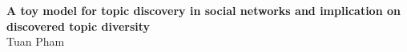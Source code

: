 \begin{flushleft}
{\Large
\textbf{A toy model for topic discovery in social networks and implication on discovered topic diversity}
}
\newline
\\
Tuan Pham
\\
\end{flushleft}
